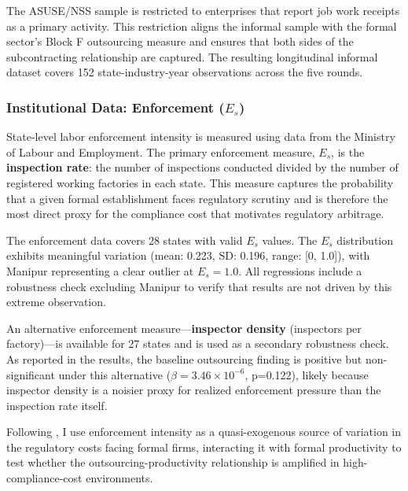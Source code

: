 The ASUSE/NSS sample is restricted to enterprises that report job work receipts as a primary activity. This restriction aligns the informal sample with the formal sector's Block F outsourcing measure and ensures that both sides of the subcontracting relationship are captured. The resulting longitudinal informal dataset covers 152 state-industry-year observations across the five rounds.

\subsubsection{Institutional Data: Enforcement ($E_s$)}

State-level labor enforcement intensity is measured using data from the Ministry of Labour and Employment. The primary enforcement measure, $E_s$, is the \textbf{inspection rate}: the number of inspections conducted divided by the number of registered working factories in each state. This measure captures the probability that a given formal establishment faces regulatory scrutiny and is therefore the most direct proxy for the compliance cost that motivates regulatory arbitrage.

The enforcement data covers 28 states with valid $E_s$ values. The $E_s$ distribution exhibits meaningful variation (mean: 0.223, SD: 0.196, range: [0, 1.0]), with Manipur representing a clear outlier at $E_s = 1.0$. All regressions include a robustness check excluding Manipur to verify that results are not driven by this extreme observation.

An alternative enforcement measure—\textbf{inspector density} (inspectors per factory)—is available for 27 states and is used as a secondary robustness check. As reported in the results, the baseline outsourcing finding is positive but non-significant under this alternative ($\beta = 3.46 \times 10^{-6}$, p=0.122), likely because inspector density is a noisier proxy for realized enforcement pressure than the inspection rate itself.

Following \textcite{Besley2004}, I use enforcement intensity as a quasi-exogenous source of variation in the regulatory costs facing formal firms, interacting it with formal productivity to test whether the outsourcing-productivity relationship is amplified in high-compliance-cost environments.

